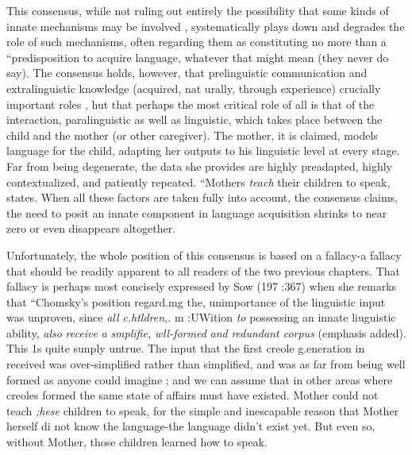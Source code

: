 This consensus, while not ruling out entirely the possibility that some kinds of innate mechanisms may be involved , systematically plays down and degrades the role of such mechanisms, often regarding them as constituting no more than a ``predisposition to acquire language, whatever that might mean (they never do say). The consensus holds, however, that prelinguistic communication and extralinguistic knowledge (acquired, nat urally, through experience)  crucially important roles , hut that perhaps the most critical role of all is that of the interaction, paralinguistic as well as linguistic, which takes place between the child and the mother (or other caregiver). The mother, it is claimed, models language for the child, adapting her outputs to his linguistic level at every stage. Far from being degenerate, the data she provides are highly preadapted, highly contextualized, and patiently repeated. ``Mothers \textit{teach} their children to speak, \citet{Bruner1979} states. When all these factors are taken fully into account, the consensus claims, the need to posit an innate component in language acquisition shrinks to near zero or even disappears altogether.

Unfortunately, the whole position of this consensus is based on a fallacy-a fallacy that should be readily apparent to all readers of the two previous chapters. That fallacy is perhaps most concisely expressed
by Sow (197 :367) when she remarks that ``Chomsky's position regard.mg the, unimportance of the linguistic input was unproven, since \textit{all} \textit{c}\textit{.}\textit{htldren},\textit{.} m :UWition \textit{to} possessing an innate liuguistic ability, \textit{also} \textit{receive} \textit{a} \textit{smplifie,} \textit{wll-formed} \textit{and} \textit{redundant corpus{\textquotedbl}} (emphasis added). This 1s quite sunply untrue. The input that the first creole g.eneration in  received was over-simplified rather than simpli\-fied, and was as far from beiug well formed as anyone could imagine ;
and we can assume that in other areas where creoles formed the same state of affairs must have existed. Mother could not teach \textit{;}\textit{hese} children to speak, for the simple and inescapable reason that Mother herself di not know the language-the language didn't exist yet. But even so, without Mother, those children learned how to speak.

